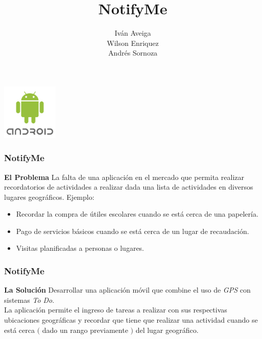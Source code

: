 \documentclass[9pt]{beamer}
\title{NotifyMe}
\author{Iván Aveiga \\ Wilson Enriquez \\ Andrés Sornoza}
\institute{Escuela Superior Politécnica del Litoral}
\begin{document}
	\begin{frame}
		\begin{center}
			\includegraphics[width=0.20\textwidth]{android.png}
		\end{center}
		\titlepage
		\scriptsize
	\end{frame}	
	
	\begin{frame}
		\frametitle{NotifyMe}
			\begin{block}{\textbf{El Problema}}
				La falta de una aplicación en el mercado que permita realizar recordatorios de actividades a realizar dada una lista de actividades
				en diversos lugares geográficos. Ejemplo:
					\begin{itemize}
						\item Recordar la compra de útiles escolares cuando se está cerca de una papelería.
						\item Pago de servicios básicos cuando se está cerca de un lugar de recaudación.
						\item Visitas planificadas a personas o lugares.
					\end{itemize}
			\end{block}
	\end{frame}
	
	\begin{frame}
		\frametitle{NotifyMe}
			\begin{block}{\textbf{La Solución}}
				Desarrollar una aplicación móvil que combine el uso de \emph{GPS} con sistemas \emph{To Do}. \\
				La aplicación permite el ingreso de tareas a realizar con sus respectivas ubicaciones geográficas y recordar
				que tiene que realizar una actividad cuando se está cerca $($ dado un rango previamente $)$ del lugar                               geográfico.
		 \end{block}
	\end{frame}
	
\end{document}
